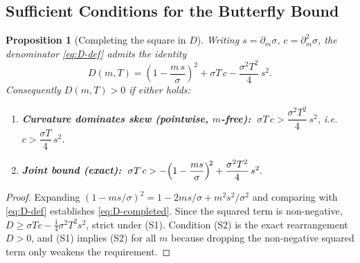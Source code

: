 \documentclass[11pt]{book}
\theoremstyle{plain}
\newtheorem{proposition}[theorem]{Proposition}
\theoremstyle{definition}
\theoremstyle{remark}
\newcommand{\mln}{m}                             %
\begin{document}
\subsection{Sufficient Conditions for the Butterfly Bound}
\label{sec:butterfly}

\begin{proposition}[Completing the square in $D$]\label{prop:D-sufficient}
Writing $s = \partial_\mln\sigma$, $c = \partial_\mln^2\sigma$, the denominator
\eqref{eq:D-def} admits the identity
\begin{equation}\label{eq:D-completed}
D(\mln,T) = \left(1 - \frac{\mln\,s}{\sigma}\right)^{\!2}
+ \sigma T\,c - \frac{\sigma^2 T^2}{4}\,s^2.
\end{equation}
Consequently $D(\mln,T) > 0$ if either holds:
\begin{enumerate}[label=\textup{(S\arabic*)}]
\item \textbf{Curvature dominates skew (pointwise, $\mln$-free):}
$\;\sigma T\,c > \dfrac{\sigma^2 T^2}{4}\,s^2$, i.e.\
$c > \dfrac{\sigma T}{4}\,s^2$.
\item \textbf{Joint bound (exact):}
$\;\sigma T\,c > -\Bigl(1 - \dfrac{\mln s}{\sigma}\Bigr)^{\!2}
+ \dfrac{\sigma^2 T^2}{4}\,s^2.$
\end{enumerate}
\end{proposition}
\begin{proof}
Expanding $(1 - \mln s/\sigma)^2 = 1 - 2\mln s/\sigma + \mln^2 s^2/\sigma^2$ and
comparing with \eqref{eq:D-def} establishes \eqref{eq:D-completed}. Since the
squared term is non-negative, $D \ge \sigma T c - \tfrac14\sigma^2 T^2 s^2$,
strict under (S1). Condition (S2) is the exact rearrangement $D>0$, and (S1)
implies (S2) for all $\mln$ because dropping the non-negative squared term only
weakens the requirement.
\end{proof}
\end{document}
